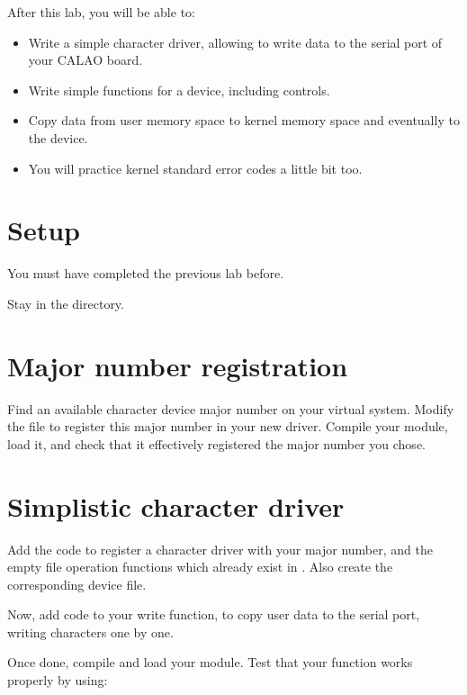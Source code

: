 
After this lab, you will be able to:

\begin{itemize}
\item Write a simple character driver, allowing to write data to the
  serial port of your CALAO board.
\item Write simple  functions for a device,
  including  controls.
\item Copy data from user memory space to kernel memory space and
  eventually to the device.
\item You will practice kernel standard error codes a little bit too.
\end{itemize}

\section{Setup}

You must have completed the previous lab before.

Stay in the  directory.

\section{Major number registration}

Find an available character device major number on your virtual
system. Modify the  file to register this major number
in your new driver. Compile your module, load it, and check that it
effectively registered the major number you chose.

\section{Simplistic character driver}

Add the code to register a character driver with your major number, and
the empty file operation functions which already exist in
. Also create the corresponding  device file.

Now, add code to your write function, to copy user data to the serial
port, writing characters one by one.

Once done, compile and load your module. Test that your  function
works properly by using:

